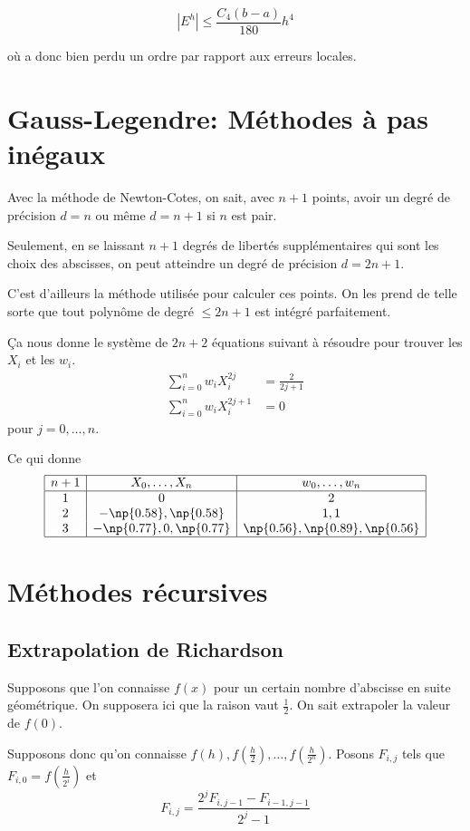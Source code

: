 $$|E^h| \leq \frac{C_4(b-a)}{180}h^4$$

où a donc bien perdu un ordre par rapport aux erreurs locales.

\section{Gauss-Legendre: Méthodes à pas inégaux}
Avec la méthode de Newton-Cotes, on sait, avec $n+1$ points, avoir
un degré de précision $d = n$ ou même $d = n+1$ si $n$ est pair.

Seulement, en se laissant $n+1$ degrés de libertés supplémentaires
qui sont les choix des abscisses, on peut atteindre
un degré de précision $d = 2n+1$.

C'est d'ailleurs la méthode utilisée pour calculer ces points.
On les prend de telle sorte que tout polynôme de degré $\leq 2n+1$ est
intégré parfaitement.

Ça nous donne le système de $2n+2$ équations suivant à résoudre
pour trouver les $X_i$ et les $w_i$.
\begin{align*}
  \sum_{i=0}^n w_i X_i^{2j} & = \frac{2}{2j+1}\\
  \sum_{i=0}^n w_i X_i^{2j+1} & = 0
\end{align*}
pour $j = 0, \ldots, n$.

Ce qui donne
\[
  \begin{array}{|c|c|c|}
    \hline
    n+1 & X_0, \ldots, X_n & w_0, \ldots, w_n\\
    \hline
    1 & 0 & 2\\
    2 & -\np{0.58}, \np{0.58} & 1, 1\\
    3 & -\np{0.77}, 0, \np{0.77} & \np{0.56}, \np{0.89}, \np{0.56}\\
    \hline
  \end{array}
\]

\section{Méthodes récursives}
\subsection{Extrapolation de Richardson}
Supposons que l'on connaisse $f(x)$ pour un certain nombre d'abscisse en
suite géométrique. On supposera ici que la raison vaut $\frac{1}{2}$.
On sait extrapoler la valeur de $f(0)$.

Supposons donc qu'on connaisse
$f(h), f\left(\frac{h}{2}\right), \ldots, f\left(\frac{h}{2^n}\right)$.
Posons
$F_{i, j}$ tels que $F_{i, 0} = f\left(\frac{h}{2^i}\right)$ et
\[ F_{i, j} = \frac{2^j F_{i, j-1} - F_{i-1, j-1}}{2^j - 1} \]

